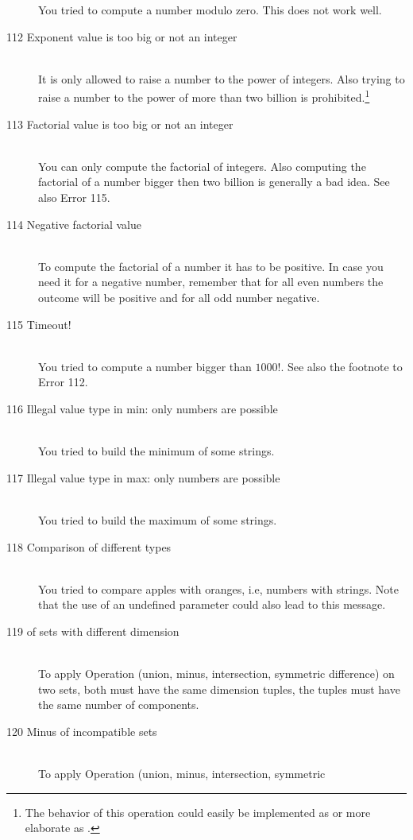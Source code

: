 \begin{description}
   You tried to compute a number modulo zero. This does not work well.
\item[112 Exponent value \code{xxx} is too big or not an integer]\ \\
   It is only allowed to raise a number to the power of integers. Also trying to
   raise a number to the power of more than two billion is 
   prohibited.\footnote{The behavior of this operation could 
   easily be implemented as  or more elaborate as 
   .}
\item[113 Factorial value \code{xxx} is too big or not an integer]\ \\
   You can only compute the factorial of integers.
   Also computing the factorial of a number bigger then two billion
   is generally a bad idea. See also Error 115.
\item[114 Negative factorial value]\ \\
   To compute the factorial of a number it has to be positive.
   In case you need it for a negative number, remember that for all 
   even numbers the outcome will be positive and for all odd number negative.
\item[115 Timeout!]\ \\
   You tried to compute a number bigger than $1000!$. 
   See also the footnote to Error 112.
\item[116 Illegal value type in min: \code{xxx} only numbers are
   possible]\ \\
   You tried to build the minimum of some strings.
\item[117 Illegal value type in max: \code{xxx} only numbers are
   possible]\ \\
   You tried to build the maximum of some strings.
\item[118 Comparison of different types]\ \\
   You tried to compare apples with oranges, i.e, numbers with
   strings. Note that the use of an undefined parameter could also
   lead to this message.
\item[119 \code{xxx} of sets with different dimension]\ \\
   To apply Operation  (union, minus, intersection, symmetric
   difference) on two sets, 
   both must have the same dimension tuples,\ie
   the tuples must have the same number of components.
\item[120 Minus of incompatible sets]\ \\
   To apply Operation  (union, minus, intersection, symmetric

\end{description}
